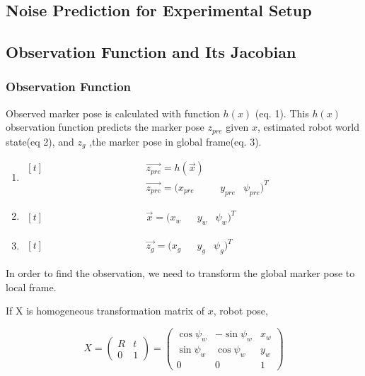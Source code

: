 \documentclass[14pt,a4paper]{article}
\begin{document}
	\subsection{Noise Prediction for Experimental Setup}	
	
	\subsection{Observation Function and Its Jacobian}
		\subsubsection{Observation Function}
	 	Observed marker pose is calculated with function $h(x)$ (eq. 1). This $h(x)$ observation function predicts the marker pose $z_{pre}$ given $x$, estimated robot world state(eq 2), and $z_{g}$ ,the marker pose in global frame(eq. 3).
		 
		\begin{enumerate}
		\item $\begin{aligned}[t]
		    &&&&&&&&&&&&& \overrightarrow{z_{pre}} =h(\vec{x}) \\
		    &&&&&&&&&&&&& \overrightarrow{z_{pre}}  = (x_{pre}&&y_{pre}&\psi_{pre})^T
		\end{aligned}$
		\item $\begin{aligned}[t]
		    &&&&&&&&&&&&& \vec{x} = (x_{w}&&y_{w}&\psi_{w})^T
		\end{aligned}$
		\item $\begin{aligned}[t]
		    &&&&&&&&&&&&& \vec{z_{g}}  = (x_{g}&&y_{g}&\psi_{g})^T
		\end{aligned}$
		\end{enumerate}
	
		In order to find the observation, we need to transform the global marker pose to local frame.
		
		If X is homogeneous transformation matrix of $x$, robot pose,
		
		$$	X =	\begin{pmatrix} 
					R & t \\
					0 & 1 
				\end{pmatrix}
			=	\begin{pmatrix}
					\cos\psi_{w}	 &	-\sin\psi_{w} & x_{w}\\	
					\sin\psi_{w} &	\cos\psi_{w}	 & y_{w}\\
					0		 &		0	&	1
				\end{pmatrix}
		$$	
		
\end{document}
